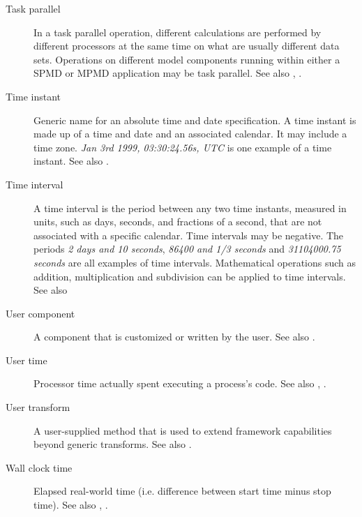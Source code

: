 \begin{description}
\item[Task parallel] \label{glos:TaskParallel}  In a task parallel operation,
  different calculations are performed by different processors at the same time
  on what are usually different data sets.  Operations on different model 
  components running within either a SPMD or MPMD application may be task 
  parallel. See also , . 

\item [Time instant] \label{glos:TimeInstant}
  Generic name for an absolute time and date specification. A time instant is made 
  up of a time and date and an associated calendar. It may include a time zone.
  \emph{Jan 3rd 1999, 03:30:24.56s, UTC} is one example of a time instant.
  See also .

\item [Time interval] \label{glos:TimeInterval} A time interval is the
  period between any two time instants, measured in units, such as days, 
  seconds, and fractions of a second, that are not associated with a specific
  calendar.  Time intervals may be negative.  The periods \emph{2 days and 10 seconds}, 
  \emph{86400 and 1/3 seconds} and \emph{31104000.75 seconds} are all examples of time intervals.  
  Mathematical operations such as addition, multiplication and subdivision 
  can be applied to time intervals. See also 

\item [User component] \label{UserComp} A component that is customized or
  written by the user.  See also .

\item [User time] \label{UserTime} Processor time actually spent executing 
  a process's code. See also , 
  .

\item[User transform] \label{glos:UserTrans} A user-supplied 
  method that is used to extend framework capabilities beyond generic 
  transforms. See also . 

\item [Wall clock time] \label{WallClockTime} Elapsed real-world time 
  (i.e. difference between start time minus stop time).
  See also , .

\end{description}








































